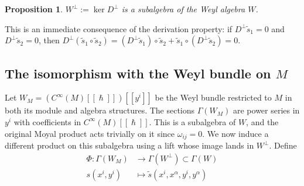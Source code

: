 \documentclass[
  12pt,
  a4paper, oneside
]{report}
\renewcommand{\hbar}{\hslash}
\theoremstyle{bolddef}
\newtheorem{proposition}[theorem]{Proposition}
\theoremstyle{remark}
\numberwithin{equation}{chapter}
\begin{document}
\begin{proposition}\label{prop:Wperp-subalg}
$W^\perp := \ker D^\perp$ is a subalgebra of the Weyl algebra $W$.
\end{proposition}

This is an immediate consequence of the derivation property: if $D^\perp \tilde{s}_1 = 0$ and $D^\perp \tilde{s}_2 = 0$, then $D^\perp(\tilde{s}_1 \circ \tilde{s}_2) = (D^\perp \tilde{s}_1) \circ \tilde{s}_2 + \tilde{s}_1 \circ (D^\perp \tilde{s}_2) = 0$.


\subsection*{The isomorphism with the Weyl bundle on $M$}

Let $W_M = (C^\infty(M)[[\hbar]])[[y^i]]$ be the Weyl bundle restricted to $M$ in both its module and algebra structures. The sections $\Gamma(W_M)$ are power series in $y^i$ with coefficients in $C^\infty(M)[[\hbar]]$. This is a subalgebra of $W$, and the original Moyal product acts trivially on it since $\omega_{ij} = 0$. We now induce a different product on this subalgebra using a lift whose image lands in $W^\perp$. Define
\begin{align}
\Phi : \Gamma(W_M) &\longrightarrow \Gamma(W^\perp) \subset \Gamma(W) \nonumber \\
s(x^i, y^i) &\longmapsto \tilde{s}(x^i, x^\alpha, y^i, y^\alpha) \label{eq:Phi-def}
\end{align}
\end{document}
